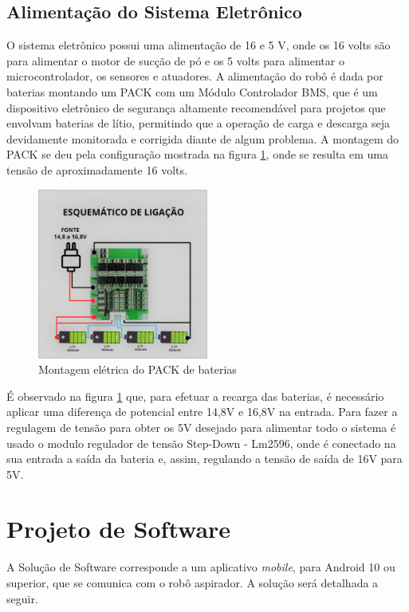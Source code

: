 \subsection{Alimentação do Sistema Eletrônico}

O sistema eletrônico possui uma alimentação de 16 e 5 V, onde os 16 volts são para alimentar o motor de sucção de pó e os 5 volts para alimentar o microcontrolador, os sensores e atuadores. A alimentação do robô é dada por baterias montando um  PACK com um Módulo Controlador BMS, que é um dispositivo eletrônico de segurança altamente recomendável para projetos que envolvam baterias de lítio, permitindo que a operação de carga e descarga seja devidamente monitorada e corrigida diante de algum problema. A montagem do PACK se deu pela configuração mostrada na figura \ref{bms}, onde se resulta em uma tensão de aproximadamente 16 volts.

\begin{figure}[H]
\centering
\includegraphics[width=0.5\textwidth]{editaveis/BMS.png}
\caption{Montagem elétrica do PACK de baterias}

\label{bms}
\end{figure}

É observado  na figura \ref{bms} que, para efetuar a recarga das baterias, é necessário aplicar uma diferença de potencial entre 14,8V e 16,8V na entrada. Para fazer a regulagem de tensão para obter os 5V desejado para alimentar todo o sistema é usado o modulo regulador de tensão Step-Down - Lm2596, onde é conectado na sua entrada a saída da bateria e, assim, regulando a tensão de saída de 16V para 5V.

\section{Projeto de Software}

A Solução de Software corresponde a um aplicativo \textit{mobile}, para Android 10 ou superior, que se comunica com o robô aspirador. A solução será detalhada a seguir.

